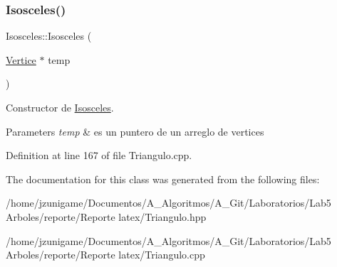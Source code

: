 \subsubsection{\texorpdfstring{Isosceles()}{Isosceles()}}
{\footnotesize\ttfamily Isosceles\+::\+Isosceles (\begin{DoxyParamCaption}\item[{\hyperlink{class_vertice}{Vertice} $\ast$}]{temp }\end{DoxyParamCaption})}



Constructor de \hyperlink{class_isosceles}{Isosceles}. 


\begin{DoxyParams}{Parameters}
{\em temp} & es un puntero de un arreglo de vertices \\
\hline
\end{DoxyParams}


Definition at line 167 of file Triangulo.\+cpp.



The documentation for this class was generated from the following files\+:\begin{DoxyCompactItemize}
\item 
/home/jzunigame/\+Documentos/\+A\+\_\+\+Algoritmos/\+A\+\_\+\+Git/\+Laboratorios/\+Lab5 Arboles/reporte/\+Reporte latex/Triangulo.\+hpp\item 
/home/jzunigame/\+Documentos/\+A\+\_\+\+Algoritmos/\+A\+\_\+\+Git/\+Laboratorios/\+Lab5 Arboles/reporte/\+Reporte latex/Triangulo.\+cpp\end{DoxyCompactItemize}
